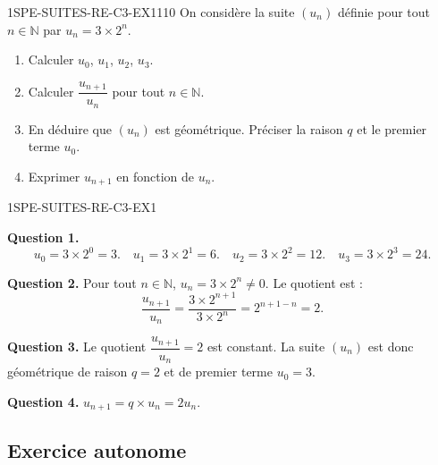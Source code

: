 \begin{exercice}{1SPE-SUITES-RE-C3-EX1}{1}{10}
On considère la suite $(u_n)$ définie pour tout $n \in \mathbb{N}$ par $u_n = 3 \times 2^n$.
\begin{enumerate}
  \item Calculer $u_0$, $u_1$, $u_2$, $u_3$.
  \item Calculer $\dfrac{u_{n+1}}{u_n}$ pour tout $n \in \mathbb{N}$.
  \item En déduire que $(u_n)$ est géométrique. Préciser la raison $q$ et le premier terme $u_0$.
  \item Exprimer $u_{n+1}$ en fonction de $u_n$.
\end{enumerate}
\end{exercice}


\begin{corrige}{1SPE-SUITES-RE-C3-EX1}

\textbf{Question 1.}
\[
u_0 = 3 \times 2^0 = 3. \quad u_1 = 3 \times 2^1 = 6. \quad u_2 = 3 \times 2^2 = 12. \quad u_3 = 3 \times 2^3 = 24.
\]


\textbf{Question 2.} Pour tout $n \in \mathbb{N}$, $u_n = 3 \times 2^n
\neq 0$. Le quotient est :
\[
\frac{u_{n+1}}{u_n} = \frac{3 \times 2^{n+1}}{3 \times 2^n} = 2^{n+1-n} = 2.
\]


\textbf{Question 3.} Le quotient $\dfrac{u_{n+1}}{u_n} = 2$ est constant. La suite $(u_n)$ est donc géométrique de raison $q = 2$ et de premier terme $u_0 = 3$.

\textbf{Question 4.} $u_{n+1} = q \times u_n = 2 u_n$.

\end{corrige}

\subsection*{Exercice autonome}

